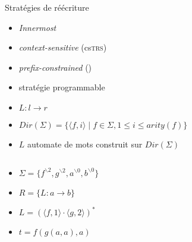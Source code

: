 \begin{frame}{Stratégies de réécriture}
  \begin{itemize}
  \item \textit{Innermost}
  \item \textit{context-sensitive} (cs\textsc{trs})
  \item \textit{prefix-constrained} (\pctrs)
  \item stratégie programmable
  \end{itemize}
\end{frame}

\begin{frame}{\pctrs}
  \begin{itemize}
  \item $L : l \rightarrow r$
  \item $Dir(\Sigma) = \{\langle f, i \rangle \mid f \in \Sigma, 1 \leq i \leq arity(f)\}$
  \item $L$ automate de mots construit sur $Dir(\Sigma)$
  \end{itemize}
  \begin{example}
    \begin{columns}
      \begin{column}{0.5\textwidth}
        \begin{itemize}
        \item $\Sigma = \{f^{\backslash 2}, g^{\backslash 2}, a^{\backslash 0}, b^{\backslash 0}\}$
        \item $R = \{L : a \rightarrow b\}$
        \item $L  = (\langle f,1 \rangle \cdot \langle g, 2 \rangle)^*$
        \item $t = f(g(a,a),a)$
        \end{itemize}
      \end{column}
      \begin{column}{0.5\textwidth}
        \begin{overprint}
\end{overprint}
\end{column}
\end{columns}
\end{example}
\end{frame}
